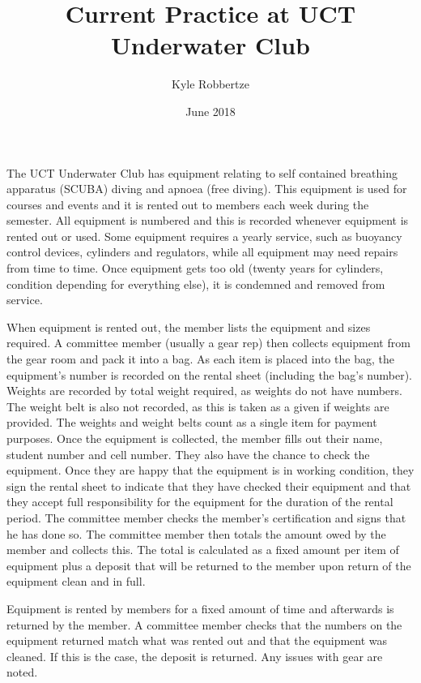 \documentclass[12pt,a4paper]{article}
\begin{document}
\title{Current Practice at UCT Underwater Club}
\author{Kyle Robbertze}
\date{June 2018}
\maketitle

The UCT Underwater Club has equipment relating to self contained breathing
apparatus (SCUBA) diving and apnoea (free diving). This equipment is used for
courses and events and it is rented out to members each week during the
semester. All equipment is numbered and this is recorded whenever equipment is
rented out or used. Some equipment requires a yearly service, such as buoyancy
control devices, cylinders and regulators, while all equipment may need repairs
from time to time. Once equipment gets too old (twenty years for cylinders,
condition depending for everything else), it is condemned and removed from
service.

When equipment is rented out, the member lists the equipment and sizes required.
A committee member (usually a gear rep) then collects equipment from the gear
room and pack it into a bag.  As each item is placed into the bag, the
equipment's number is recorded on the rental sheet (including the bag's number).
Weights are recorded by total weight required, as weights do not have numbers.
The weight belt is also not recorded, as this is taken as a given if weights are
provided. The weights and weight belts count as a single item for payment
purposes. Once the equipment is collected, the member fills out their name,
student number and cell number. They also have the chance to check the
equipment. Once they are happy that the equipment is in working condition, they
sign the rental sheet to indicate that they have checked their equipment and
that they accept full responsibility for the equipment for the duration of the
rental period. The committee member checks the member's certification and signs
that he has done so. The committee member then totals the amount owed by the
member and collects this. The total is calculated as a fixed amount per item of
equipment plus a deposit that will be returned to the member upon return of the
equipment clean and in full.

Equipment is rented by members for a fixed amount of time and afterwards is
returned by the member. A committee member checks that the numbers on the
equipment returned match what was rented out and that the equipment was cleaned.
If this is the case, the deposit is returned. Any issues with gear are noted.
\end{document}
